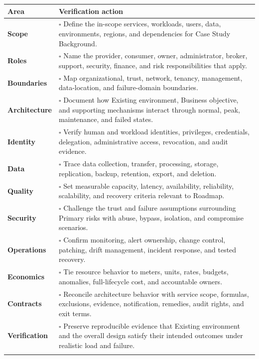 \documentclass[11pt]{article}
\begin{document}
\begin{longtable}{@{}>{\bfseries\color{Teal}}p{}>{\RaggedRight\arraybackslash}p{}@{}}
\toprule\textbf{Area} & \textbf{Verification action}\\\midrule\endhead
Scope & $\square$ Define the in-scope services, workloads, users, data, environments, regions, and dependencies for Case Study Background. \\\addlinespace[2pt]
Roles & $\square$ Name the provider, consumer, owner, administrator, broker, support, security, finance, and risk responsibilities that apply. \\\addlinespace[2pt]
Boundaries & $\square$ Map organizational, trust, network, tenancy, management, data-location, and failure-domain boundaries. \\\addlinespace[2pt]
Architecture & $\square$ Document how Existing environment, Business objective, and supporting mechanisms interact through normal, peak, maintenance, and failed states. \\\addlinespace[2pt]
Identity & $\square$ Verify human and workload identities, privileges, credentials, delegation, administrative access, revocation, and audit evidence. \\\addlinespace[2pt]
Data & $\square$ Trace data collection, transfer, processing, storage, replication, backup, retention, export, and deletion. \\\addlinespace[2pt]
Quality & $\square$ Set measurable capacity, latency, availability, reliability, scalability, and recovery criteria relevant to Roadmap. \\\addlinespace[2pt]
Security & $\square$ Challenge the trust and failure assumptions surrounding Primary risks with abuse, bypass, isolation, and compromise scenarios. \\\addlinespace[2pt]
Operations & $\square$ Confirm monitoring, alert ownership, change control, patching, drift management, incident response, and tested recovery. \\\addlinespace[2pt]
Economics & $\square$ Tie resource behavior to meters, units, rates, budgets, anomalies, full-lifecycle cost, and accountable owners. \\\addlinespace[2pt]
Contracts & $\square$ Reconcile architecture behavior with service scope, formulas, exclusions, evidence, notification, remedies, audit rights, and exit terms. \\\addlinespace[2pt]
Verification & $\square$ Preserve reproducible evidence that Existing environment and the overall design satisfy their intended outcomes under realistic load and failure. \\\addlinespace[2pt]
\bottomrule
\end{longtable}
\end{document}
